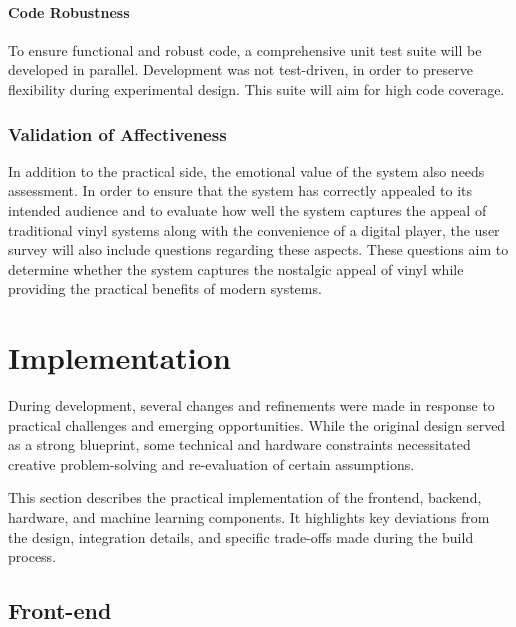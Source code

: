                     \paragraph{Code Robustness} To ensure functional and robust code, a comprehensive unit test suite will be developed in parallel. Development was not test-driven, in order to preserve flexibility during experimental design. This suite will aim for high code coverage.
            
                \subsubsection{Validation of Affectiveness}
                    
                    In addition to the practical side, the emotional value of the system also needs assessment. In order to ensure that the system has correctly appealed to its intended audience and to evaluate how well the system captures the appeal of traditional vinyl systems along with the convenience of a digital player, the user survey will also include questions regarding these aspects. These questions aim to determine whether the system captures the nostalgic appeal of vinyl while providing the practical benefits of modern systems.
    
    \section{Implementation}
    
        During development, several changes and refinements were made in response to practical challenges and emerging opportunities. While the original design served as a strong blueprint, some technical and hardware constraints necessitated creative problem-solving and re-evaluation of certain assumptions.
    
        This section describes the practical implementation of the frontend, backend, hardware, and machine learning components. It highlights key deviations from the design, integration details, and specific trade-offs made during the build process.
    
        \subsection{Front-end}
    
